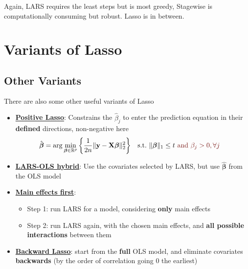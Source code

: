 \documentclass[twoside]{article}
\begin{document}
Again, LARS requires the least steps but is most greedy, Stagewise is computationally consuming but robust. Lasso is in between.

\section{}

\section{Variants of Lasso}

\subsection{Other Variants}
There are also some other useful variants of Lasso
\begin{itemize}
    \item \textbf{\underline{Positive Lasso}}: Constrains the $\hat{\beta}_j$ to enter the prediction equation in their \textbf{defined} directions, non-negative here 
    \begin{align*}
        \hat{\boldsymbol{\beta}} &= \arg\min_{\boldsymbol{\beta}\in \mathbb{R}^p}\left\{ \frac{1}{2n} \lVert \mathbf{y}-\mathbf{X}\boldsymbol{\beta} \rVert^2_2 \right\} & \text{s.t.\ } & \lVert \boldsymbol{\beta} \rVert _1 \leq t \textcolor{myred}{\text{ and } \beta_j>0, \forall j}
    \end{align*}
    \item \textbf{\underline{LARS-OLS hybrid}}: Use the covariates selected by LARS, but use $\hat{\boldsymbol{\beta}}$ from the OLS model 
    \item \textbf{\underline{Main effects first}}:
    \begin{itemize}
        \item Step 1: run LARS for a model, considering \textbf{only} main effects 
        \item Step 2: run LARS again, with the chosen main effects, and \textbf{all possible interactions} between them
    \end{itemize}
    \item \textbf{\underline{Backward Lasso}}: start from the \textbf{full} OLS model, and eliminate covariates \textbf{backwards} (by the order of correlation going 0 the earliest)
\end{itemize}
\end{document}
